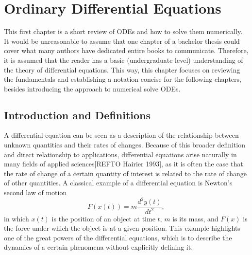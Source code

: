 \chapter{Ordinary Differential Equations}

This first chapter is a short review of \gls{ODE}s and how to solve them numerically.
It would be unreasonable to assume that one chapter of a bachelor thesis could cover what many authors have dedicated entire books to communicate.
Therefore, it is assumed that the reader has a basic (undergraduate level) understanding of the theory of differential equations\footnotemark.
This way, this chapter focuses on reviewing the fundamentals and establishing a notation concise for the following chapters, besides introducing the approach to numerical solve \gls{ODE}s.

\section{Introduction and Definitions}

A differential equation can be seen as a description of the relationship between unknown quantities and their rates of changes.
Because of this broader definition and direct relationship to applications, differential equations arise naturally in many fields of applied sciences[REFTO Hairier 1993], as it is often the case that the rate of change of a certain quantity of interest is related to the rate of change of other quantities.
A classical example of a differential equation is Newton's second law of motion \[
F\left( x\left( t \right) \right) = m \frac{d^2 y(t)}{d t^2}
,\] in which $x\left( t \right) $ is the position of an object at time $t$, $m$ is its mass, and $F(x)$ is the force under which the object is at a given position.
This example highlights one of the great powers of the differential equations, which is to describe the dynamics of a certain phenomena without explicitly defining it.


